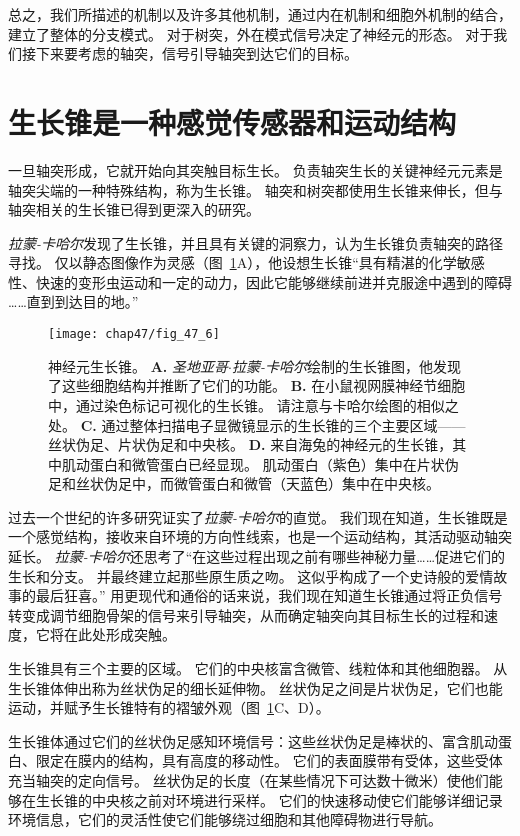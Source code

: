 总之，我们所描述的机制以及许多其他机制，通过内在机制和细胞外机制的结合，建立了整体的分支模式。
对于树突，外在模式信号决定了神经元的形态。
对于我们接下来要考虑的轴突，信号引导轴突到达它们的目标。



\section{生长锥是一种感觉传感器和运动结构}

一旦轴突形成，它就开始向其突触目标生长。
负责轴突生长的关键神经元元素是轴突尖端的一种特殊结构，称为生长锥。
轴突和树突都使用生长锥来伸长，但与轴突相关的生长锥已得到更深入的研究。


\textit{拉蒙-卡哈尔}发现了生长锥，并且具有关键的洞察力，认为生长锥负责轴突的路径寻找。
仅以静态图像作为灵感（图~\ref{fig:47_6}A），他设想生长锥“具有精湛的化学敏感性、快速的变形虫运动和一定的动力，因此它能够继续前进并克服途中遇到的障碍 
……直到到达目的地。”


\begin{figure}[htbp]
	\centering
	\texttt{[image: chap47/fig\_47\_6]}
	\caption{神经元生长锥。
		\textbf{A.} \textit{圣地亚哥$\cdot$拉蒙-卡哈尔}绘制的生长锥图，他发现了这些细胞结构并推断了它们的功能。
		\textbf{B.} 在小鼠视网膜神经节细胞中，通过染色标记可视化的生长锥。
		请注意与卡哈尔绘图的相似之处。
		\textbf{C.} 通过整体扫描电子显微镜显示的生长锥的三个主要区域——丝状伪足、片状伪足和中央核。
		\textbf{D.} 来自海兔的神经元的生长锥，其中肌动蛋白和微管蛋白已经显现。
		肌动蛋白（紫色）集中在片状伪足和丝状伪足中，而微管蛋白和微管（天蓝色）集中在中央核。}
	\label{fig:47_6}
\end{figure}


过去一个世纪的许多研究证实了\textit{拉蒙-卡哈尔}的直觉。
我们现在知道，生长锥既是一个感觉结构，接收来自环境的方向性线索，也是一个运动结构，其活动驱动轴突延长。
\textit{拉蒙-卡哈尔}还思考了“在这些过程出现之前有哪些神秘力量……促进它们的生长和分支。
并最终建立起那些原生质之吻。
这似乎构成了一个史诗般的爱情故事的最后狂喜。” 
用更现代和通俗的话来说，我们现在知道生长锥通过将正负信号转变成调节细胞骨架的信号来引导轴突，从而确定轴突向其目标生长的过程和速度，它将在此处形成突触。


生长锥具有三个主要的区域。
它们的中央核富含微管、线粒体和其他细胞器。
从生长锥体伸出称为丝状伪足的细长延伸物。
丝状伪足之间是片状伪足，它们也能运动，并赋予生长锥特有的褶皱外观（图~\ref{fig:47_6}C、D）。


生长锥体通过它们的丝状伪足感知环境信号：这些丝状伪足是棒状的、富含肌动蛋白、限定在膜内的结构，具有高度的移动性。
它们的表面膜带有受体，这些受体充当轴突的定向信号。
丝状伪足的长度（在某些情况下可达数十微米）使他们能够在生长锥的中央核之前对环境进行采样。
它们的快速移动使它们能够详细记录环境信息，它们的灵活性使它们能够绕过细胞和其他障碍物进行导航。


